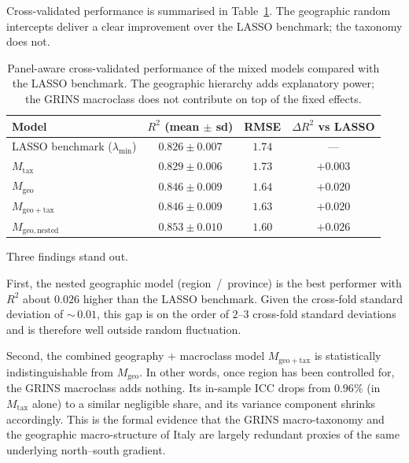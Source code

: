 \documentclass[11pt,a4paper]{article}
\begin{document}
Cross-validated performance is summarised in
Table~\ref{tab:lmm_cv}. The geographic random intercepts deliver a
clear improvement over the LASSO benchmark; the taxonomy does not.

\begin{table}[h!]
  \centering
  \begin{tabular}{lccc}
    \toprule
    Model & \(R^{2}\) (mean \(\pm\) sd) & RMSE & \(\Delta R^{2}\) vs LASSO \\
    \midrule
    LASSO benchmark (\(\lambda_{\min}\))     & \(0.826 \pm 0.007\) & \(1.74\) & --- \\
    \(M_{\mathrm{tax}}\)                     & \(0.829 \pm 0.006\) & \(1.73\) & \(+0.003\) \\
    \(M_{\mathrm{geo}}\)                     & \(0.846 \pm 0.009\) & \(1.64\) & \(+0.020\) \\
    \(M_{\mathrm{geo+tax}}\)                 & \(0.846 \pm 0.009\) & \(1.63\) & \(+0.020\) \\
    \(M_{\mathrm{geo,nested}}\)              & \(\mathbf{0.853 \pm 0.010}\) & \(\mathbf{1.60}\) & \(+\mathbf{0.026}\) \\
    \bottomrule
  \end{tabular}
  \caption{Panel-aware cross-validated performance of the mixed models
    compared with the LASSO benchmark. The geographic hierarchy adds
    explanatory power; the GRINS macroclass does not contribute on top
    of the fixed effects.}
  \label{tab:lmm_cv}
\end{table}

Three findings stand out.

First, the nested geographic model (region~/~province) is the best
performer with \(R^{2}\) about \(0.026\) higher than the LASSO
benchmark. Given the cross-fold standard deviation of \(\sim\,0.01\),
this gap is on the order of \(2\)--\(3\) cross-fold standard
deviations and is therefore well outside random fluctuation.

Second, the combined geography + macroclass model
\(M_{\mathrm{geo+tax}}\) is statistically indistinguishable from
\(M_{\mathrm{geo}}\). In other words, once region has been controlled
for, the GRINS macroclass adds nothing. Its in-sample ICC drops from
\(0.96\%\) (in \(M_{\mathrm{tax}}\) alone) to a similar negligible
share, and its variance component shrinks accordingly. This is the
formal evidence that the GRINS macro-taxonomy and the geographic
macro-structure of Italy are largely redundant proxies of the same
underlying north--south gradient.
\end{document}
